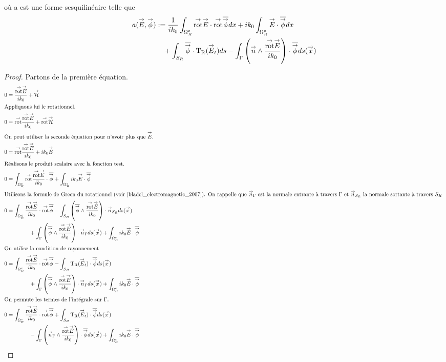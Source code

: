   où a est une forme sesquilinéaire telle que
  \begin{equation*}
    \begin{aligned}
    a({\overset{\rightarrow}{E}},{\overset{\rightarrow}{\phi}}) &:=  \dfrac{1}{ik_0} \int_{\Omega^c_R} {{\overset{\rightarrow}{\operatorname{rot}}}} {\overset{\rightarrow}{E}} \cdot {{\overset{\rightarrow}{\operatorname{rot}}}} {\overline{{\overset{\rightarrow}{\phi}}}} dx + ik_0\int_{\Omega^c_R}{\overset{\rightarrow}{E}}\cdot{\overline{{\overset{\rightarrow}{\phi}}}} dx
      \\ 
      & \quad + \int_{S_R} {\overline{ {\overset{\rightarrow}{\phi}} }} \cdot \operatorname{T_R}({\overset{\rightarrow}{E}}_t)ds - \int_\Gamma \left({\overset{\rightarrow}{n}} \wedge \dfrac{{{\overset{\rightarrow}{\operatorname{rot}}}} {\overset{\rightarrow}{E}}}{ik_0}\right) \cdot {\overline{{\overset{\rightarrow}{\phi}}}} ds({\overset{\rightarrow}{x}})
    \end{aligned}
   \end{equation*}

  \begin{proof}
    Partons de la première équation.
    \begin{align}
          0 & = \frac{\trot \vE}{ik_0} + \vH
          \\ \intertext{Appliquons lui le rotationnel.}
          0 & = \trot \frac{\trot \vE}{ik_0} + \trot \vH
          \\ \intertext{On peut utiliser la seconde équation pour n'avoir plus que \(\vE\).}
          0 & = \trot \frac{\trot \vE}{ik_0} + ik_0 \vE
          \\ \intertext{Réalisons le produit scalaire avec la fonction test.}
          0 & = \int_{\OO^c_R}{ \trot \frac{\trot \vE}{ik_0}\cdot \conj{\vect{\phi}}} +  \int_{\OO^c_R} ik_0 \vE \cdot \conj{\vect{\phi}}
          \\ \intertext{Utilisons la formule de Green du rotationnel (voir \cite[eq.~(A1.32)]{bladel_electromagnetic_2007}). On rappelle que \(\vn_\Gamma\) est la normale entrante à travers \(\Gamma\) et \(\vn_{S_R}\) la normale sortante à travers \(S_R\) }
          0 & = \int_{\OO^c_R}{ \frac{\trot \vE}{ik_0}\cdot \trot \conj{\vect{\phi}}} - \int_{S_R} \left( \conj{\vect \phi} \pvect \frac{\trot \vE}{ik_0}\right)  \cdot \vn_{S_R} ds(\vx) 
          \\ \notag
          & \qquad \qquad + \int_\Gamma \left( \conj{\vect \phi} \pvect \frac{\trot \vE}{ik_0}\right)  \cdot \vn_\Gamma ds(\vx) +\int_{\OO^c_R} ik_0 \vE \cdot \conj{\vect{\phi}}
          \\ \intertext{On utilise la condition de rayonnement}
          0 & = \int_{\OO^c_R}{ \frac{\trot \vE}{ik_0}\cdot \trot \conj{\vect{\phi}}} - \int_{S_R} \Tr(\vE_t)  \cdot \conj{\vect{\phi}} ds(\vx) 
          \\ \notag
          & \qquad \qquad + \int_\Gamma \left( \conj{\vect \phi} \pvect \frac{\trot \vE}{ik_0}\right)  \cdot \vn_\Gamma ds(\vx) + \int_{\OO^c_R} ik_0 \vE \cdot \conj{\vect{\phi}}
          \\ \intertext{On permute les termes de l'intégrale sur \(\Gamma\).}
          0 & =\int_{\OO^c_R} \frac{\trot \vE}{ik_0}\cdot \trot \conj{\vect{\phi}} + \int_{S_R} \Tr(\vE_t)  \cdot \conj{\vect{\phi}} ds(\vx) 
          \\ \notag
          & \qquad \qquad - \int_\Gamma \left(\vn_\Gamma \pvect \frac{\trot \vE}{ik_0}\right) \cdot \conj{\vect \phi} ds(\vx) +  \int_{\OO^c_R} ik_0 \vE \cdot \conj{\vect{\phi}}
      \end{align}
  \end{proof}

